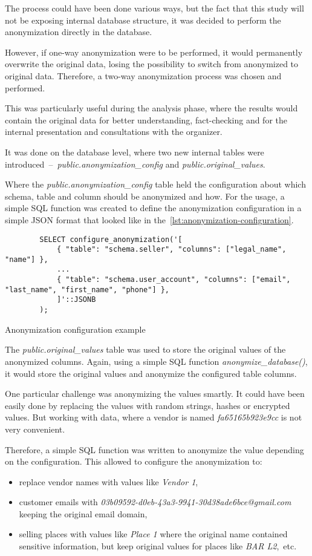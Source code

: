 The process could have been done various ways, but the fact that this study will not be exposing internal database structure, it was decided to perform the anonymization directly in the database.

However, if one-way anonymization were to be performed, it would permanently overwrite the original data, losing the possibility to switch from anonymized to original data.
Therefore, a two-way anonymization process was chosen and performed.

This was particularly useful during the analysis phase, where the results would contain the original data for better understanding, fact-checking and for the internal presentation and consultations with the organizer.

It was done on the database level, where two new internal tables were introduced~–~\textit{public.anonymization\_config} and \textit{public.original\_values}.

Where the \textit{public.anonymization\_config} table held the configuration about which schema, table and column should be anonymized and how.
For the usage, a simple SQL function was created to define the anonymization configuration in a simple JSON format that looked like in the~\autoref{lst:anonymization-configuration}.

\begin{listing}[h]
	\begin{verbatim}
		SELECT configure_anonymization('[
			{ "table": "schema.seller", "columns": ["legal_name", "name"] },
			...
			{ "table": "schema.user_account", "columns": ["email", "last_name", "first_name", "phone"] },
			]'::JSONB
		);
	\end{verbatim}
	\caption{Anonymization configuration example}
	\label{lst:anonymization-configuration}
\end{listing}

The \textit{public.original\_values} table was used to store the original values of the anonymized columns.
Again, using a simple SQL function \textit{anonymize\_database()}, it would store the original values and anonymize the configured table columns.

One particular challenge was anonymizing the values smartly.
It could have been easily done by replacing the values with random strings, hashes or encrypted values.
But working with data, where a vendor is named \textit{fa65165b923e9cc} is not very convenient.

Therefore, a simple SQL function was written to anonymize the value depending on the configuration.
This allowed to configure the anonymization to:
\begin{itemize}
	\item replace vendor names with values like \textit{Vendor 1},
	\item customer emails with \textit{03b09592-d0eb-43a3-9941-30d38ade6bce@gmail.com} keeping the original email domain,
	\item selling places with values like \textit{Place 1} where the original name contained sensitive information, but keep original values for places like \textit{BAR L2},~etc.
\end{itemize}

